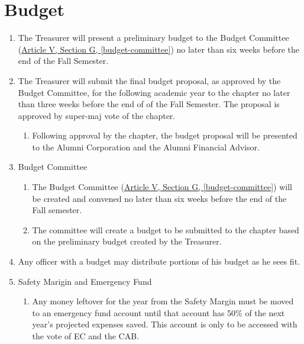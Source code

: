 \section{Budget}
	\label{budget}
	\begin{enumerate}
		\item The Treasurer will present a preliminary budget to the Budget Committee (\hyperref[budget-committee]{Article V, Section G, \autoref*{budget-committee}}) no later than six weeks before the end of the Fall Semester.
		\item The Treasurer will submit the final budget proposal, as approved by the Budget Committee, for the following academic year to the chapter no later than three weeks before the end of of the Fall Semester. The proposal is approved by \gls{super-maj} vote of the chapter.
			\begin{enumerate}
				\item Following approval by the chapter, the budget proposal will be presented to the Alumni Corporation and the Alumni Financial Advisor.
			\end{enumerate}
            

		\item Budget Committee
			\begin{enumerate}
				\item The Budget Committee (\hyperref[budget-committee]{Article V, Section G, \autoref*{budget-committee}}) will be created and convened no later than six weeks before the end of the Fall semester.
				\item The committee will create a budget to be submitted to the chapter based on the preliminary budget created by the Treasurer.
			\end{enumerate}
          
        \item Any officer with a budget may distribute portions of his budget as he sees fit.
	
    
    	\item Safety Marigin and Emergency Fund
        	\begin{enumerate}
            	\item Any money leftover for the year from the Safety Margin must be moved to an emergency fund account until that account has 50\% of the next year’s projected expenses saved. This account is only to be accessed with the vote of EC and the CAB.
             \end{enumerate}
     \end{enumerate}

